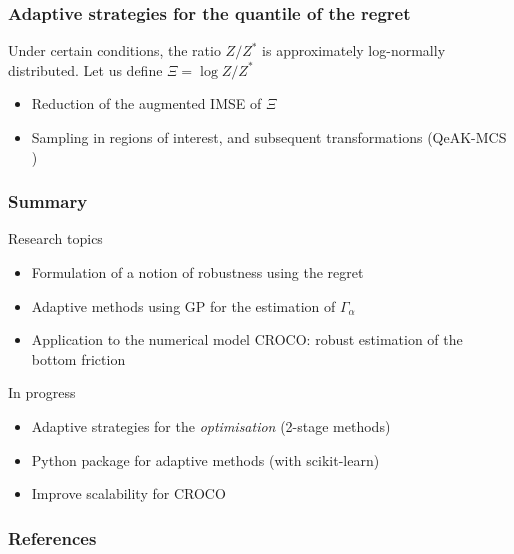 \documentclass[11pt]{beamer}
\begin{document}
\begin{frame}
  \frametitle{Adaptive strategies for the quantile of the regret}
  Under certain conditions, the ratio $Z/Z^*$ is approximately
  log-normally distributed.  Let us define $\Xi = \log Z/ Z^*$

  \begin{itemize}
  \item Reduction of the augmented IMSE of $\Xi$
  \end{itemize}
  \begin{itemize}
  \item Sampling in regions of interest, and subsequent transformations (QeAK-MCS \citep{razaaly_rare_2019})
  \end{itemize}
\end{frame}

\begin{frame}
\frametitle{Summary}
\begin{block}{Research topics}
\begin{itemize}
\item Formulation of a notion of robustness using the regret
\item Adaptive methods using GP for the estimation of $\Gamma_{\alpha}$
\item Application to the numerical model CROCO: robust estimation of the bottom friction
\end{itemize}
\end{block}


\begin{block}{In progress}
\begin{itemize}
\item Adaptive strategies for the \emph{optimisation} (2-stage methods)
\item Python package for adaptive methods (with scikit-learn)
\item Improve scalability for CROCO
\end{itemize}
\end{block}
\end{frame}
\begin{frame}[allowframebreaks]
  \renewcommand{\bibsection}{}

  \frametitle{References}


\end{frame}


\appendix
\end{document}
